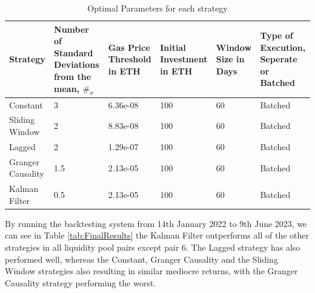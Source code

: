 \begin{table}[H]
    \centering
    \begin{tabular}{|p{4em}|p{8em}|p{4em}|p{4em}|p{4em}|p{8em}|}
    \hline
        Strategy & Number of Standard Deviations from the mean, $\#_{\sigma}$ & Gas Price Threshold in ETH & Initial Investment in ETH & Window Size in Days & Type of Execution, Seperate or Batched \\ \hline
        Constant & 3 & 6.36e-08 & 100 & 60 & Batched \\ \hline
        Sliding Window & 2 & 8.83e-08 & 100 & 60 & Batched \\ \hline
        Lagged & 2 & 1.29e-07 & 100 & 60 & Batched \\ \hline
        Granger Causality & 1.5 & 2.13e-05 & 100 & 60 & Batched \\ \hline
        Kalman Filter & 0.5 & 2.13e-05 & 100 & 60 & Batched \\ \hline
    \end{tabular}
    \caption{Optimal Parameters for each strategy \label{tab:OptimParams}}
\end{table}

By running the backtesting system from 14th January 2022 to 9th June 2023, we can see in Table \ref{tab:FinalResults} the Kalman Filter outperforms all of the other strategies in all liquidity pool pairs except pair 6. The Lagged strategy has also performed well, whereas the Constant, Granger Causality and the Sliding Window strategies also resulting in similar mediocre returns, with the Granger Causality strategy performing the worst.

